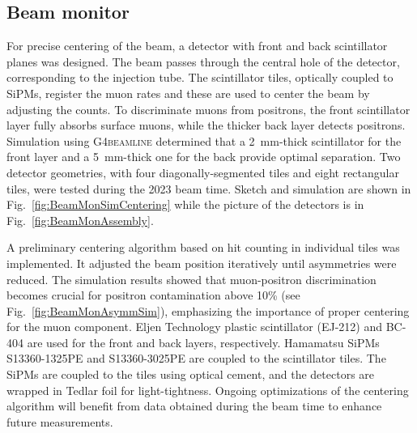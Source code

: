 \begin{refsection}
    \subsection{Beam monitor}
        For precise centering of the beam, a detector with front and back scintillator planes was designed. 
        The beam passes through the central hole of the detector, corresponding to the injection tube. 
        The scintillator tiles, optically coupled to SiPMs, register the muon rates and these are used to center the beam by adjusting the counts.
        To discriminate muons from positrons, the front scintillator layer fully absorbs surface muons, while the thicker back layer detects positrons.
        Simulation using \textsc{G4beamline} determined that a \SI{2}{mm}-thick scintillator for the front layer and a \SI{5}{mm}-thick one for the back provide optimal separation.
        Two detector geometries, with four diagonally-segmented tiles and eight rectangular tiles, were tested during the 2023 beam time.
        Sketch and simulation are shown in Fig.~\ref{fig:BeamMonSimCentering} while the picture of the detectors is in Fig.~\ref{fig:BeamMonAssembly}.
        
        \noindent
        A preliminary centering algorithm based on hit counting in individual tiles was implemented. 
        It adjusted the beam position iteratively until asymmetries were reduced. 
        The simulation results showed that muon-positron discrimination becomes crucial for positron contamination above 10\% (see Fig.~\ref{fig:BeamMonAsymmSim}), emphasizing the importance of proper centering for the muon component.
        Eljen Technology plastic scintillator (EJ-212) and BC-404 are used for the front and back layers, respectively. 
        Hamamatsu SiPMs S13360-1325PE and S13360-3025PE are coupled to the scintillator tiles. 
        The SiPMs are coupled to the tiles using optical cement, and the detectors are wrapped in Tedlar foil for light-tightness. 
        Ongoing optimizations of the centering algorithm will benefit from data obtained during the beam time to enhance future measurements.
        

\end{refsection}
